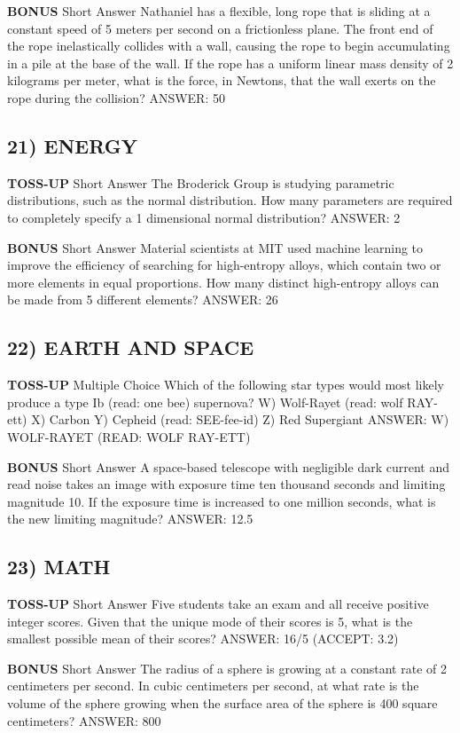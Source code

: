 \documentclass{article}
\begin{document}
\textbf{BONUS}
Short Answer Nathaniel has a flexible, long rope that is sliding at a constant speed of 5 meters per second on a frictionless plane. The front end of the rope inelastically collides with a wall, causing the rope to begin accumulating in a pile at the base of the wall. If the rope has a uniform linear mass density of 2 kilograms per meter, what is the force, in Newtons, that the wall exerts on the rope during the collision?
ANSWER: 50

\subsection*{21) ENERGY}
\textbf{TOSS-UP}
Short Answer The Broderick Group is studying parametric distributions, such as the normal distribution. How many parameters are required to completely specify a 1 dimensional normal distribution?
ANSWER: 2

\textbf{BONUS}
Short Answer Material scientists at MIT used machine learning to improve the efficiency of searching for high-entropy alloys, which contain two or more elements in equal proportions. How many distinct high-entropy alloys can be made from 5 different elements?
ANSWER: 26

\subsection*{22) EARTH AND SPACE}
\textbf{TOSS-UP}
Multiple Choice Which of the following star types would most likely produce a type Ib (read: one bee) supernova?
W) Wolf-Rayet (read: wolf RAY-ett)
X) Carbon
Y) Cepheid (read: SEE-fee-id)
Z) Red Supergiant
ANSWER: W) WOLF-RAYET (READ: WOLF RAY-ETT)

\textbf{BONUS}
Short Answer A space-based telescope with negligible dark current and read noise takes an image with exposure time ten thousand seconds and limiting magnitude 10. If the exposure time is increased to one million seconds, what is the new limiting magnitude?
ANSWER: 12.5

\subsection*{23) MATH}
\textbf{TOSS-UP}
Short Answer Five students take an exam and all receive positive integer scores. Given that the unique mode of their scores is 5, what is the smallest possible mean of their scores?
ANSWER: 16/5 (ACCEPT: 3.2)

\textbf{BONUS}
Short Answer The radius of a sphere is growing at a constant rate of 2 centimeters per second. In cubic centimeters per second, at what rate is the volume of the sphere growing when the surface area of the sphere is 400 square centimeters?
ANSWER: 800\pi
\end{document}
